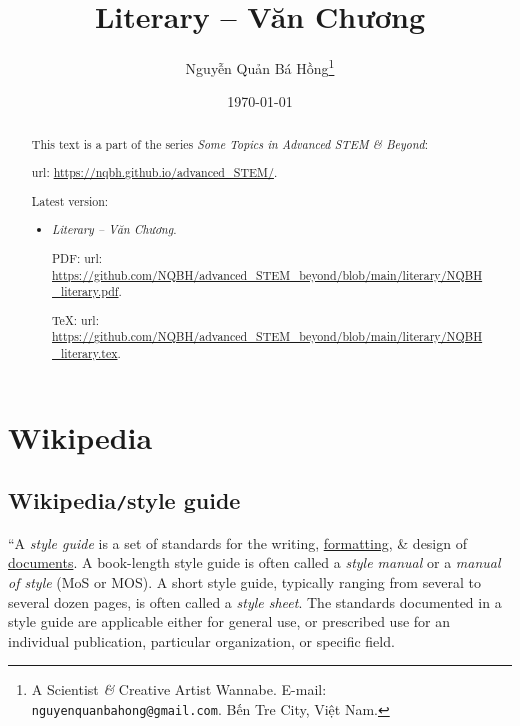 \documentclass{article}
\title{Literary -- Văn Chương}
\author{Nguyễn Quản Bá Hồng\footnote{A Scientist {\it\&} Creative Artist Wannabe. E-mail: {\tt nguyenquanbahong@gmail.com}. Bến Tre City, Việt Nam.}}
\date{\today}
\begin{document}
\maketitle
\begin{abstract}
	This text is a part of the series {\it Some Topics in Advanced STEM \& Beyond}:
	
	{\sc url}: \url{https://nqbh.github.io/advanced_STEM/}.
	
	Latest version:
	\begin{itemize}
		\item {\it Literary -- Văn Chương}.
		
		PDF: {\sc url}: \url{https://github.com/NQBH/advanced_STEM_beyond/blob/main/literary/NQBH_literary.pdf}.
		
		\TeX: {\sc url}: \url{https://github.com/NQBH/advanced_STEM_beyond/blob/main/literary/NQBH_literary.tex}.
	\end{itemize}
\end{abstract}
\tableofcontents


\section{Wikipedia}

\subsection{Wikipedia{\tt/}style guide}
``A {\it style guide} is a set of standards for the writing, \href{https://en.wikipedia.org/wiki/Typesetting}{formatting}, \& design of \href{https://en.wikipedia.org/wiki/Document}{documents}. A book-length style guide is often called a {\it style manual} or a {\it manual of style} (MoS or MOS). A short style guide, typically ranging from several to several dozen pages, is often called a {\it style sheet}. The standards documented in a style guide are applicable either for general use, or prescribed use for an individual publication, particular organization, or specific field.
\end{document}
